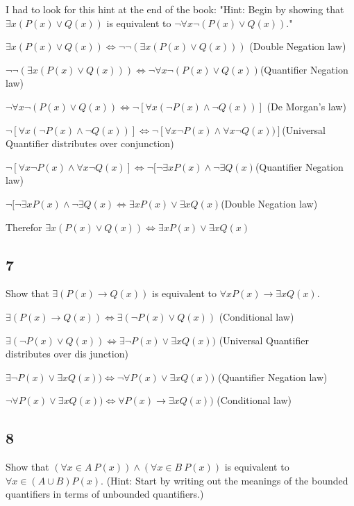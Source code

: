 \documentclass{article}
\begin{document}
I had to look for this hint at the end of the book: "Hint: Begin by showing that $\exists x(P(x) \lor Q(x))$ is equivalent to
$\neg \forall x\neg (P(x) \lor Q(x)).$"

$\exists x(P(x) \lor Q(x)) \Leftrightarrow \neg \neg (\exists x(P(x) \lor Q(x)))$ (Double Negation law)

$\neg \neg (\exists x(P(x) \lor Q(x))) \Leftrightarrow \neg \forall x \neg (P(x) \lor Q(x))$(Quantifier Negation law)

$\neg \forall x\neg (P(x) \lor Q(x)) \Leftrightarrow \neg [\forall x (\neg P(x) \land \neg Q(x))]$ (De Morgan's law)

$\neg[ \forall x (\neg P(x) \land \neg Q(x)) ]\Leftrightarrow \neg[ \forall x \neg P(x) \land \forall x\neg Q(x))]$(Universal Quantifier distributes over conjunction)

$\neg [\forall x \neg P(x) \land \forall x\neg Q(x) ]\Leftrightarrow \neg[ \neg \exists x P(x) \land \neg \exists Q(x)$(Quantifier Negation law)

$\neg[ \neg \exists x P(x) \land \neg \exists Q(x) \Leftrightarrow \exists xP(x) \lor \exists xQ(x) $(Double Negation law)


Therefor $\exists x(P(x) \lor Q(x)) \Leftrightarrow \exists xP(x) \lor
\exists xQ(x)$
\subsection{7}
Show that $\exists (P(x) \rightarrow Q(x))$ is equivalent to $\forall xP(x) \rightarrow \exists xQ(x)$.

$\exists (P(x) \rightarrow Q(x)) \Leftrightarrow \exists (\neg P(x) \lor Q(x))$  (Conditional law)

$\exists (\neg P(x) \lor Q(x)) \Leftrightarrow \exists \neg P(x) \lor \exists x Q(x))$ (Universal Quantifier distributes over dis junction)

$\exists \neg P(x) \lor \exists x Q(x)) \Leftrightarrow \neg \forall P(x) \lor \exists x Q(x))$ (Quantifier Negation law)

$\neg \forall P(x) \lor \exists x Q(x)) \Leftrightarrow \forall P(x) \rightarrow \exists x Q(x))$ (Conditional law)

\subsection{8}
Show that $(\forall x \in A \ P(x)) \land (\forall x \in B  \ P(x))$ is equivalent to $\forall x \in (A \cup B) P(x)$. (Hint: Start by writing out the meanings of the bounded
quantifiers in terms of unbounded quantifiers.)
\end{document}
